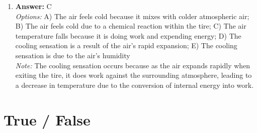 \documentclass[12pt]{article}
\begin{document}
\begin{enumerate}[label=\arabic*.]
\item \textbf{Answer:} C
\\ \textit{Options:} A) The air feels cold because it mixes with colder atmospheric air; B) The air feels cold due to a chemical reaction within the tire; C) The air temperature falls because it is doing work and expending energy; D) The cooling sensation is a result of the air's rapid expansion; E) The cooling sensation is due to the air's humidity
\\ \textit{Note:} The cooling sensation occurs because as the air expands rapidly when exiting the tire, it does work against the surrounding atmosphere, leading to a decrease in temperature due to the conversion of internal energy into work.
\end{enumerate}

\section*{True / False}
\end{document}
